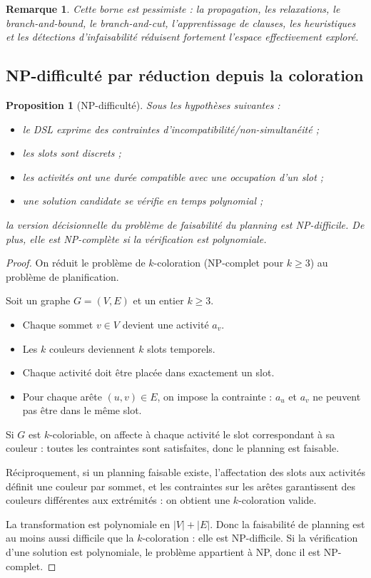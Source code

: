 \documentclass[12pt,a4paper]{article}
\newtheorem{proposition}{Proposition}[section]
\newtheorem{remark}{Remarque}[section]
\begin{document}
\begin{remark}
Cette borne est pessimiste : la propagation, les relaxations, le \textit{branch-and-bound}, le \textit{branch-and-cut}, l'apprentissage de clauses, les heuristiques et les détections d'infaisabilité réduisent fortement l'espace effectivement exploré.
\end{remark}

\subsection{NP-difficulté par réduction depuis la coloration}
\begin{proposition}[NP-difficulté]
Sous les hypothèses suivantes :
\begin{itemize}
  \item le DSL exprime des contraintes d'incompatibilité/non-simultanéité ;
  \item les slots sont discrets ;
  \item les activités ont une durée compatible avec une occupation d'un slot ;
  \item une solution candidate se vérifie en temps polynomial ;
\end{itemize}
la version décisionnelle du problème de faisabilité du planning est NP-difficile. De plus, elle est NP-complète si la vérification est polynomiale.
\end{proposition}
\begin{proof}
On réduit le problème de $k$-coloration (NP-complet pour $k\ge 3$) au problème de planification.

Soit un graphe $G=(V,E)$ et un entier $k\ge 3$.
\begin{itemize}
  \item Chaque sommet $v\in V$ devient une activité $a_v$.
  \item Les $k$ couleurs deviennent $k$ slots temporels.
  \item Chaque activité doit être placée dans exactement un slot.
  \item Pour chaque arête $(u,v)\in E$, on impose la contrainte : $a_u$ et $a_v$ ne peuvent pas être dans le même slot.
\end{itemize}

Si $G$ est $k$-coloriable, on affecte à chaque activité le slot correspondant à sa couleur : toutes les contraintes sont satisfaites, donc le planning est faisable.

Réciproquement, si un planning faisable existe, l'affectation des slots aux activités définit une couleur par sommet, et les contraintes sur les arêtes garantissent des couleurs différentes aux extrémités : on obtient une $k$-coloration valide.

La transformation est polynomiale en $|V|+|E|$. Donc la faisabilité de planning est au moins aussi difficile que la $k$-coloration : elle est NP-difficile. Si la vérification d'une solution est polynomiale, le problème appartient à NP, donc il est NP-complet.
\end{proof}
\end{document}
